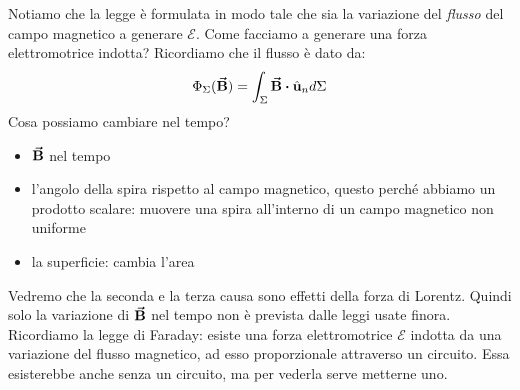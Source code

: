 Notiamo che la legge è formulata in modo tale che sia la variazione del \textit{flusso} del campo magnetico a generare $\mathcal{E}$. Come facciamo a generare una forza elettromotrice indotta? Ricordiamo che il flusso è dato da:
\begin{equation*}
	\Phi_\Sigma(\vba B)=\int_\Sigma \vba B\vdot \vbh{u}_n d\Sigma	
\end{equation*}
Cosa possiamo cambiare nel tempo? 
\begin{itemize}
	\item $\vb*{\va{B}}$ nel tempo
	\item l'angolo della spira rispetto al campo magnetico, questo perché abbiamo un prodotto scalare: muovere una spira all'interno di un campo magnetico non uniforme
	\item la superficie: cambia l'area
\end{itemize}


Vedremo che la seconda e la terza causa sono effetti della forza di Lorentz. Quindi solo la variazione di $\vb*{\va{B}}$ nel tempo  non è prevista dalle leggi usate finora.\\


Ricordiamo la legge di Faraday: esiste una forza elettromotrice $\mathcal{E}$ indotta da una variazione del flusso magnetico, ad esso proporzionale attraverso un circuito. Essa esisterebbe anche senza un circuito, ma per vederla serve metterne uno.\\


